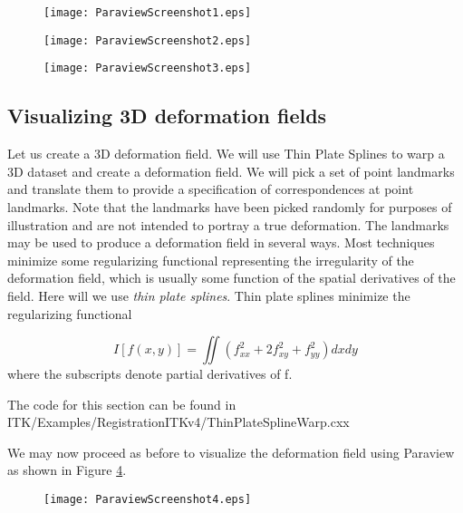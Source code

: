 \begin{figure}
\center
\texttt{[image: ParaviewScreenshot1.eps]}
\label{fig:ParaviewScreenshot1}
\end{figure}

\begin{figure}
\center
\texttt{[image: ParaviewScreenshot2.eps]}
\label{fig:ParaviewScreenshot2}
\end{figure}

\begin{figure}
\center
\texttt{[image: ParaviewScreenshot3.eps]}
\label{fig:ParaviewScreenshot3}
\end{figure}



\subsection{Visualizing 3D deformation fields}
Let us create a 3D deformation field. We will use Thin Plate Splines to warp a 3D dataset and create a deformation field. We will pick a set of point landmarks and translate them to provide a specification of correspondences at point landmarks. Note that the landmarks have been picked randomly for purposes of illustration and are not intended to portray a true deformation. The landmarks may be used to produce a deformation field in several ways. Most techniques minimize some regularizing functional representing the irregularity of the deformation field, which is usually some function of the spatial derivatives of the field. Here will we use {\it thin plate splines}. Thin plate splines minimize the regularizing functional

\begin{equation}
I[f(x,y)] = \iint (f^2_{xx} + 2 f^2_{xy} + f^2_{yy}) dx dy
\end{equation}
where the subscripts denote partial derivatives of f.

The code for this section can be found in ITK/Examples/RegistrationITKv4/ThinPlateSplineWarp.cxx

We may now proceed as before to visualize the deformation field using Paraview as shown in Figure \ref{fig:ParaviewScreenshot4}.

\begin{figure}
\center
\texttt{[image: ParaviewScreenshot4.eps]}
\label{fig:ParaviewScreenshot4}
\end{figure}



